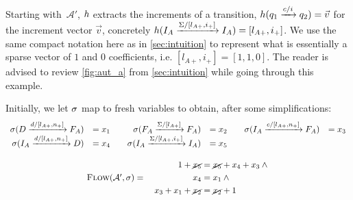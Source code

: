 Starting with~$\mathcal{A}'$, $h$ extracts the increments of a transition, $h(q_1 \xrightarrow{c / i} q_2) = \Vec{v}$ for the increment
vector $\Vec{v}$, concretely $h(I_A \xrightarrow{\Sigma / \left[ l_{A+}, i_+
\right]} I_A) = \left[ l_{A+}, i_+ \right]$. We use the same compact notation
here as in \cref{sec:intuition} to represent what is essentially a sparse vector
of $1$ and $0$ coefficients, i.e. $\left[ l_{A+}, i_+ \right] = \left[1, 1,
0\right]$.  The reader is
advised to review \cref{fig:aut_a} from
\cref{sec:intuition} while going through this example.

Initially, we let $\operatorname{\sigma}$ map to fresh variables to obtain, after some simplifications:
\begin{equation}\label{eq:single-filter}
  \begin{array}{rl@{\qquad}rl@{\qquad}rl}
    \Filter(\FromLabelTo{D}{d/[l_{A+}, n_+]}{F_A})
    &= \TransitionVar_1
    &
    \Filter(\FromLabelTo{F_A}{\Sigma/[ l_{A+} ]}{F_A} )
    &= \TransitionVar_2   
    &
    \Filter(\FromLabelTo{I_A}{c/[l_{A+}, n_+]}{F_A} ) 
    &=  \TransitionVar_3 
    \\
    \Filter(\FromLabelTo{I_A}{d/[l_{A+}, n_+]}{D}) 
    &= \TransitionVar_4
    &
    \Filter(\FromLabelTo{I_A}{\Sigma/[ l_{A+}, i_+]}{I_A}) 
    &= \TransitionVar_5  \\[3ex]
%
  \multicolumn{6}{c}{
    \FlowEq(\mathcal{A}', \Filter)  =\quad \begin{aligned}
                       1 + \cancel{\TransitionVar_5} &= \cancel{\TransitionVar_5} + \TransitionVar_4 + \TransitionVar_3 \wedge\mbox{}\\
                    \TransitionVar_4 &= \TransitionVar_1 \wedge\mbox{}\\
                    \TransitionVar_3 + \TransitionVar_1 + \cancel{\TransitionVar_2} &= \cancel{\TransitionVar_2} + 1  \\
                    \end{aligned}}
  \end{array}
\end{equation}


